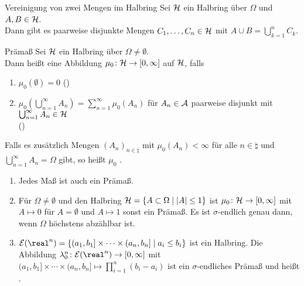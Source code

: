 \begin{Satz}{Vereinigung von zwei Mengen im Halbring}
    Sei $\mathcal{H}$ ein Halbring über $\Omega$ und $A, B \in \mathcal{H}$.\\
    Dann gibt es paarweise disjunkte Mengen $C_1, \dotsc, C_n \in \mathcal{H}$ mit
    $A \cup B = \bigcup_{k=1}^n C_k$.
\end{Satz}

\linie

\begin{Def}{Prämaß}
    Sei $\mathcal{H}$ ein Halbring über $\Omega \not= \emptyset$.\\
    Dann heißt eine Abbildung $\mu_0\colon \mathcal{H} \rightarrow [0, \infty]$ 
    auf $\mathcal{H}$, falls
    \begin{enumerate}
        \item
        $\mu_0(\emptyset) = 0$ ()

        \item
        $\mu_0(\bigcup_{n=1}^\infty A_n) = \sum_{n=1}^\infty \mu_0(A_n)$ für
        $A_n \in \mathcal{A}$ paarweise disjunkt mit $\bigcup_{n=1}^\infty A_n \in \mathcal{H}$\\
        ()
    \end{enumerate}
    Falls es zusätzlich Mengen $(A_n)_{n \in \natural}$ mit $\mu_0(A_n) < \infty$ für alle
    $n \in \natural$ und $\bigcup_{n=1}^\infty A_n = \Omega$ gibt, so heißt $\mu_0$
    .
\end{Def}

\linie
\pagebreak

\begin{Bsp}
    \begin{enumerate}
        \item
        Jedes Maß ist auch ein Prämaß.

        \item
        Für $\Omega \not= \emptyset$ und den Halbring $\mathcal{H} = \{A \subset \Omega \;|\; |A| \le 1\}$
        ist $\mu_0\colon \mathcal{H} \rightarrow [0, \infty]$ mit $A \mapsto 0$ für $A = \emptyset$ und
        $A \mapsto 1$ sonst ein Prämaß.
        Es ist $\sigma$-endlich genau dann, wenn $\Omega$ höchstens abzählbar ist.

        \item
        $\E(\real^n) = \{(a_1, b_1] \times \dotsb \times (a_n, b_n] \;|\; a_i \le b_i\}$
        ist ein Halbring.
        Die Abbildung $\lambda_0^n\colon \E(\real^n) \rightarrow [0, \infty]$ mit
        $(a_1, b_1] \times \dotsb \times (a_n, b_n] \mapsto \prod_{i=1}^n (b_i - a_i)$
        ist ein $\sigma$-endliches Prämaß und heißt .
    \end{enumerate}
\end{Bsp}

